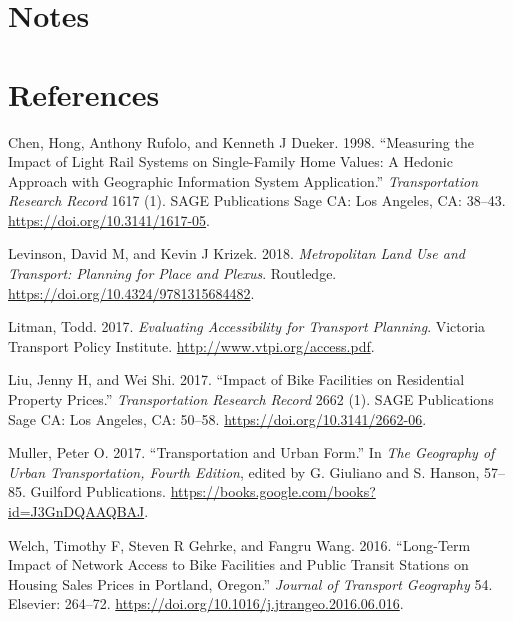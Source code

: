 \documentclass[12pt,]{article}
\begin{document}
\hypertarget{notes}{%
\section{Notes}\label{notes}}

\hypertarget{references}{%
\section*{References}\label{references}}

\hypertarget{refs}{}
\leavevmode\hypertarget{ref-chen1998measuring}{}%
Chen, Hong, Anthony Rufolo, and Kenneth J Dueker. 1998. ``Measuring the
Impact of Light Rail Systems on Single-Family Home Values: A Hedonic
Approach with Geographic Information System Application.''
\emph{Transportation Research Record} 1617 (1). SAGE Publications Sage
CA: Los Angeles, CA: 38--43. \url{https://doi.org/10.3141/1617-05}.

\leavevmode\hypertarget{ref-levinson2018metropolitan}{}%
Levinson, David M, and Kevin J Krizek. 2018. \emph{Metropolitan Land Use
and Transport: Planning for Place and Plexus}. Routledge.
\url{https://doi.org/10.4324/9781315684482}.

\leavevmode\hypertarget{ref-litman2017evaluating}{}%
Litman, Todd. 2017. \emph{Evaluating Accessibility for Transport
Planning}. Victoria Transport Policy Institute.
\url{http://www.vtpi.org/access.pdf}.

\leavevmode\hypertarget{ref-liu2017impact}{}%
Liu, Jenny H, and Wei Shi. 2017. ``Impact of Bike Facilities on
Residential Property Prices.'' \emph{Transportation Research Record}
2662 (1). SAGE Publications Sage CA: Los Angeles, CA: 50--58.
\url{https://doi.org/10.3141/2662-06}.

\leavevmode\hypertarget{ref-Muller2017transportation}{}%
Muller, Peter O. 2017. ``Transportation and Urban Form.'' In \emph{The
Geography of Urban Transportation, Fourth Edition}, edited by G.
Giuliano and S. Hanson, 57--85. Guilford Publications.
\url{https://books.google.com/books?id=J3GnDQAAQBAJ}.

\leavevmode\hypertarget{ref-welch2016long}{}%
Welch, Timothy F, Steven R Gehrke, and Fangru Wang. 2016. ``Long-Term
Impact of Network Access to Bike Facilities and Public Transit Stations
on Housing Sales Prices in Portland, Oregon.'' \emph{Journal of
Transport Geography} 54. Elsevier: 264--72.
\url{https://doi.org/10.1016/j.jtrangeo.2016.06.016}.
\end{document}
